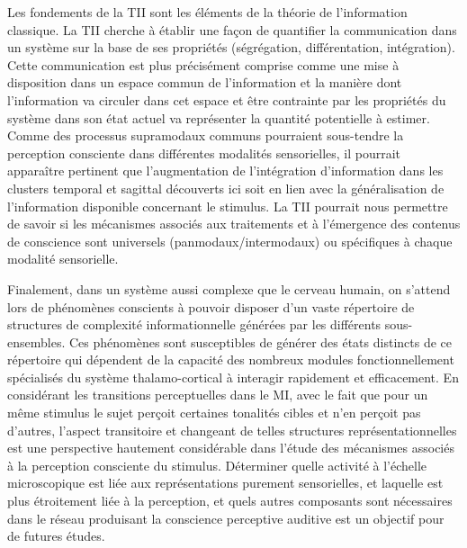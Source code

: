 Les fondements de la TII sont les éléments de la théorie de l'information classique. 
La TII cherche à établir une façon de quantifier la communication dans un système sur la base de ses propriétés (ségrégation, différentation, intégration). 
Cette communication est plus précisément comprise comme une mise à disposition dans un espace commun de l'information et la manière dont l'information va circuler dans cet espace et être contrainte par les propriétés du système dans son état actuel va représenter la quantité potentielle à estimer. 
Comme des processus supramodaux communs pourraient sous-tendre la perception consciente dans différentes modalités sensorielles, il pourrait apparaître pertinent que l'augmentation de l'intégration d'information dans les clusters temporal et sagittal découverts ici soit en lien avec la généralisation de l'information disponible concernant le stimulus.
La TII pourrait nous permettre de savoir si les mécanismes associés aux traitements et à l'émergence des contenus de conscience sont universels (panmodaux/intermodaux) ou spécifiques à chaque modalité sensorielle. 

Finalement, dans un système aussi complexe que le cerveau humain, on s'attend lors de phénomènes conscients à pouvoir disposer d'un vaste répertoire de structures de complexité informationnelle générées par les différents sous-ensembles. 
Ces phénomènes sont susceptibles de générer des états distincts de ce répertoire qui dépendent de la capacité des nombreux modules fonctionnellement spécialisés du système thalamo-cortical à interagir rapidement et efficacement. 
En considérant les transitions perceptuelles dans le MI, avec le fait que pour un même stimulus le sujet perçoit certaines tonalités cibles et n'en perçoit pas d'autres, l'aspect transitoire et changeant de telles structures représentationnelles est une perspective hautement considérable dans l'étude des mécanismes associés à la perception consciente du stimulus. 
Déterminer quelle activité à l'échelle microscopique est liée aux représentations purement sensorielles, et laquelle est plus étroitement liée à la perception, et quels autres composants sont nécessaires dans le réseau produisant la conscience perceptive auditive est un objectif pour de futures études. 

